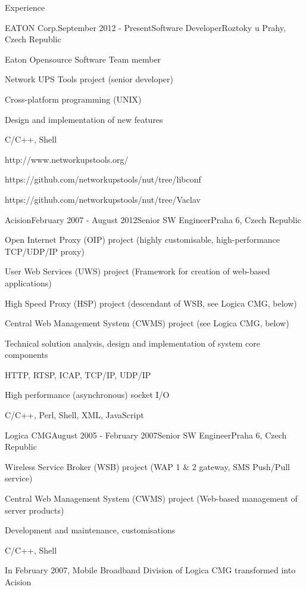 \documentclass{resume} %
\begin{document}
\begin{rSection}{Experience}

\begin{rSubsection}{EATON Corp.}{September 2012 - Present}{Software Developer}{Roztoky u Prahy, Czech Republic}
\item Eaton Opensource Software Team member
\item Network UPS Tools project (senior developer)
\item Cross-platform programming (UNIX)
\item Design and implementation of new features
\item C/C++, Shell
\item http://www.networkupstools.org/
\item https://github.com/networkupstools/nut/tree/libconf
\item https://github.com/networkupstools/nut/tree/Vaclav
\end{rSubsection}


\begin{rSubsection}{Acision}{February 2007 - August 2012}{Senior SW Engineer}{Praha 6, Czech Republic}
\item Open Internet Proxy (OIP) project (highly customisable, high-performance TCP/UDP/IP proxy)
\item User Web Services (UWS) project (Framework for creation of web-based applications)
\item High Speed Proxy (HSP) project (descendant of WSB, see Logica CMG, below)
\item Central Web Management System (CWMS) project (see Logica CMG, below)
\item Technical solution analysis, design and implementation of system core components
\item HTTP, RTSP, ICAP, TCP/IP, UDP/IP
\item High performance (asynchronous) socket I/O
\item C/C++, Perl, Shell, XML, JavaScript
\end{rSubsection}


\begin{rSubsection}{Logica CMG}{August 2005 - February 2007}{Senior SW Engineer}{Praha 6, Czech Republic}
\item Wireless Service Broker (WSB) project (WAP 1 \& 2 gateway, SMS Push/Pull service)
\item Central Web Management System (CWMS) project (Web-based management of server products)
\item Development and maintenance, customisations
\item C/C++, Shell
\item In February 2007, Mobile Broadband Division of Logica CMG transformed into Acision
\end{rSubsection}


\end{rSection}
\end{document}
